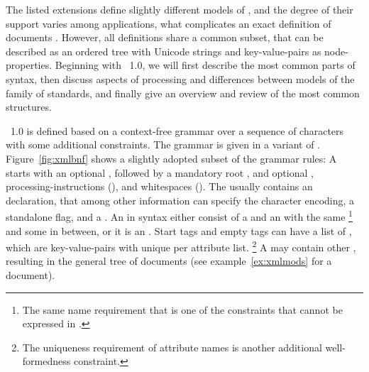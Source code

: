 The listed extensions define slightly different models of ,
and the degree of their support varies among applications, what 
complicates an exact definition of  documents \cite{Dodds2002}.
However, all definitions share a common subset, that can be described as 
an ordered tree with Unicode strings and key-value-pairs as node-properties.
Beginning with ~1.0, we will first describe the most common parts of 
 syntax, then discuss aspects of  processing and differences 
between models of the  family of standards, and finally give an 
overview and review of the most common  structures.

~1.0 is defined based on a context-free grammar over a sequence of
 characters with some additional 
constraints. The grammar is given in a variant of . 
Figure~\ref{fig:xmlbnf} shows a slightly adopted subset of the grammar rules: 
A  starts with an optional , followed by a mandatory 
root , and optional , processing-instructions (),
and whitespaces (). The  usually contains an 
 declaration, that among other information can specify the 
character encoding, a standalone flag, and a .
An  in  syntax either consist of a  and
an  with the same \footnote{The same name requirement
that is one of the constraints that cannot be expressed in .} and some
 in between, or it is an .
Start tags and empty tags can have a list of , which are
key-value-pairs with unique  per attribute list.%
\footnote{The uniqueness requirement of attribute names is another 
additional well-formedness constraint.} A  may contain
other , resulting in the general tree of  documents 
(see example~\ref{ex:xmlmods} for a document).

